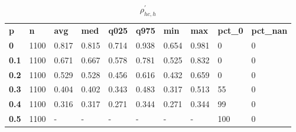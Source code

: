 \begin{table}[h]
 \centering 
\footnotesize
\caption{$\rho_{hc,h}^\prime $}
\label{tab:alphahch}
\begin{tabular}[h]{| l l l l l l l l l l|
    } \hline
\textbf{ p} & \textbf{ n} & \textbf{ avg} & \textbf{ med} & \textbf{ q025} & \textbf{ q975} & \textbf{ min} & \textbf{ max} & \textbf{ pct\_0} & \textbf{ pct\_nan}
           \\
  \textbf{  0} & 1100 & 0.817 & 0.815 & 0.714 & 0.938 & 0.654 & 0.981 &   0 & 0
           \\
  \textbf{0.1} & 1100 & 0.671 & 0.667 & 0.578 & 0.781 & 0.525 & 0.832 &   0 & 0
           \\
  \textbf{0.2} & 1100 & 0.529 & 0.528 & 0.456 & 0.616 & 0.432 & 0.659 &   0 & 0
           \\
  \textbf{0.3} & 1100 & 0.404 & 0.402 & 0.343 & 0.483 & 0.317 & 0.513 &  55 & 0
           \\
  \textbf{0.4} & 1100 & 0.316 & 0.317 & 0.271 & 0.344 & 0.271 & 0.344 &  99 & 0
           \\
  \textbf{0.5} & 1100 & - & - & - & - & - & - & 100 & 0
           \\
 \hline \end{tabular}
 \end{table}
